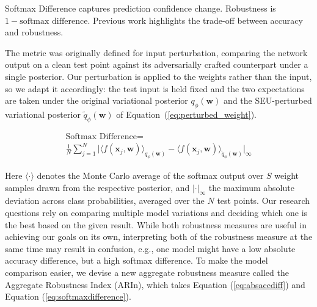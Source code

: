 Softmax Difference \cite{carbone2020a} captures prediction confidence change. Robustness is $1 - \text{softmax difference}$. Previous work \cite{isrobustnessdongsu2018} highlights the trade-off between accuracy and robustness.

The metric was originally defined for input perturbation, comparing the network output on a clean test point against its adversarially crafted counterpart under a single posterior. Our perturbation is applied to the weights rather than the input, so we adapt it accordingly: the test input is held fixed and the two expectations are taken under the original variational posterior $q_{\phi}(\mathbf{w})$ and the SEU-perturbed variational posterior $\tilde{q}_{\phi}(\mathbf{w})$ of Equation~(\ref{eq:perturbed_weight}).

    \begin{multline} \label{eq:softmaxdifference}
    \text{Softmax Difference}=\\ \frac{1}{N} \sum_{j=1}^{N}
    \Big|
    \big\langle f(\mathbf{x}_j, \mathbf{w}) \big\rangle_{q_{\phi}(\mathbf{w})}
    -
    \big\langle f(\mathbf{x}_j, \mathbf{w}) \big\rangle_{\tilde{q}_{\phi}(\mathbf{w})}
    \Big|_{\infty}
    \end{multline}

Here $\langle \cdot \rangle$ denotes the Monte Carlo average of the softmax output over $S$ weight samples drawn from the respective posterior, and $|\cdot|_{\infty}$ the maximum absolute deviation across class probabilities, averaged over the $N$ test points.
Our research questions rely on comparing multiple model variations and deciding which one is the best based on the given result. While both robustness measures are useful in achieving our goals on its own, interpreting both of the robustness measure at the same time may result in confusion, e.g., one model might have a low absolute accuracy difference, but a high softmax difference. To make the model comparison easier, we devise a new aggregate robustness measure called the Aggregate Robustness Index (ARIn), which takes Equation (\ref{eq:absaccdiff}) and Equation (\ref{eq:softmaxdifference}).



